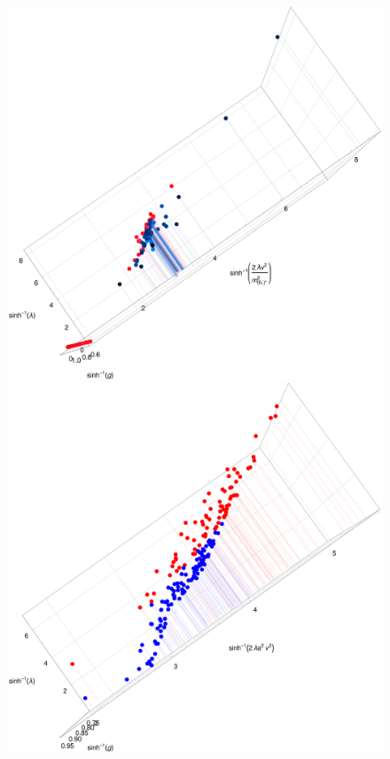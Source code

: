 \documentclass[final,12pt]{article}
\newcommand*{\1}{1\!\!\!\bot}
\begin{document}
\begin{figure}[!htbp]
\vspace{-0.5cm}
\begin{minipage}{0.7\linewidth}
\includegraphics[width=\linewidth]{lcp-su2-cont}\\
\includegraphics[width=\linewidth]{lcp-su3-cont}

\end{minipage}
\end{figure}
\end{document}
